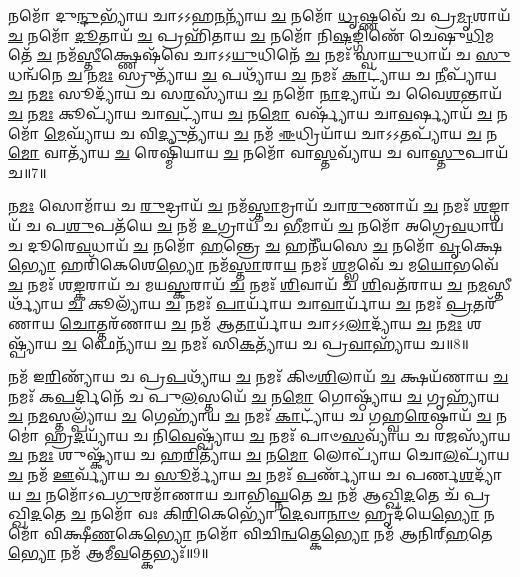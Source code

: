 𑌨𑌮𑍋᳴ 𑌦𑍁\-\ul{𑌨𑍍𑌦𑍁}\-𑌭𑍍𑌯𑌾᳴𑌯 𑌚𑌾𑌽𑌽𑌹\-\ul{𑌨}\-𑌨𑍍𑌯𑌾᳴𑌯 \ul{𑌚} 𑌨𑌮𑍋᳴ \ul{𑌧𑍃}\-𑌷𑍍𑌣𑌵𑍇᳴ 𑌚 𑌪𑍍𑌰\-\ul{𑌮𑍃}\-𑌶𑌾𑌯᳴ \ul{𑌚} 𑌨𑌮𑍋᳴ \ul{𑌦𑍂}\-𑌤𑌾𑌯᳴ \ul{𑌚} 𑌪𑍍𑌰𑌹𑌿᳴𑌤𑌾𑌯 \ul{𑌚} 𑌨𑌮𑍋᳴ 𑌨𑌿\-\ul{𑌷}\-𑌙𑍍𑌗𑌿𑌣𑍇᳴ 𑌚𑍇𑌷𑍁\-\ul{𑌧𑌿}\-𑌮𑌤𑍇᳴ \ul{𑌚} 𑌨𑌮᳴\-\ul{𑌸𑍍𑌤𑍀}\-𑌕𑍍𑌷𑍍𑌣𑍇𑌷᳴𑌵𑍇 𑌚𑌾𑌽𑌽\-\ul{𑌯𑍁}\-𑌧𑌿𑌨𑍇᳴ \ul{𑌚} 𑌨𑌮𑌃᳴ 𑌸𑍍𑌵𑌾\-\ul{𑌯𑍁}\-𑌧𑌾𑌯᳴ 𑌚 \ul{𑌸𑍁}\-𑌧𑌨𑍍𑌵᳴𑌨𑍇 \ul{𑌚} 𑌨\-\ul{𑌮𑌃} 𑌸𑍍𑌰𑍁𑌤𑍍𑌯𑌾᳴𑌯 \ul{𑌚} 𑌪𑌥𑍍𑌯𑌾᳴𑌯 \ul{𑌚} 𑌨𑌮𑌃᳴ \ul{𑌕𑌾}\-𑌟𑍍𑌯𑌾᳴𑌯 𑌚 \ul{𑌨𑍀}\-𑌪𑍍𑌯𑌾᳴𑌯 \ul{𑌚} 𑌨\-\ul{𑌮𑌃} 𑌸𑍂𑌦𑍍𑌯𑌾᳴𑌯 𑌚 𑌸\-\ul{𑌰}\-𑌸𑍍𑌯𑌾᳴𑌯 \ul{𑌚} 𑌨𑌮𑍋᳴ \ul{𑌨𑌾}\-𑌦𑍍𑌯𑌾𑌯᳴ 𑌚 𑌵𑍈\-\ul{𑌶}\-𑌨𑍍𑌤𑌾𑌯᳴ \ul{𑌚} 𑌨\-\ul{𑌮𑌃} 𑌕𑍂𑌪𑍍𑌯𑌾᳴𑌯 𑌚𑌾\-\ul{𑌵}\-𑌟𑍍𑌯𑌾᳴𑌯 \ul{𑌚} 𑌨\-\ul{𑌮𑍋} 𑌵𑌰𑍍𑌷𑍍𑌯𑌾᳴𑌯 𑌚𑌾\-\ul{𑌵}\-𑌰𑍍𑌷𑍍𑌯𑌾𑌯᳴ \ul{𑌚} 𑌨𑌮𑍋᳴ \ul{𑌮𑍇}\-𑌘𑍍𑌯𑌾᳴𑌯 𑌚 𑌵𑌿\-\ul{𑌦𑍍𑌯𑍁}\-𑌤𑍍𑌯𑌾᳴𑌯 \ul{𑌚} 𑌨𑌮᳴ \ul{𑌈}\-𑌧𑍍𑌰𑌿𑌯𑌾᳴𑌯 𑌚𑌾𑌽𑌽\-\ul{𑌤}\-𑌪𑍍𑌯𑌾᳴𑌯 \ul{𑌚} 𑌨\-\ul{𑌮𑍋} 𑌵𑌾𑌤𑍍𑌯𑌾᳴𑌯 \ul{𑌚} 𑌰𑍇𑌷𑍍𑌮𑌿᳴𑌯𑌾𑌯 \ul{𑌚} 𑌨𑌮𑍋᳴ 𑌵𑌾\-\ul{𑌸𑍍𑌤}\-𑌵𑍍𑌯𑌾᳴𑌯 𑌚 𑌵𑌾\-\ul{𑌸𑍍𑌤𑍁}\-𑌪𑌾𑌯᳴ 𑌚॥7॥ 

𑌨\-\ul{𑌮𑌃} 𑌸𑍋𑌮𑌾᳴𑌯 𑌚 \ul{𑌰𑍁}\-𑌦𑍍𑌰𑌾𑌯᳴ \ul{𑌚} 𑌨𑌮᳴\-\ul{𑌸𑍍𑌤𑌾}\-𑌮𑍍𑌰𑌾𑌯᳴ 𑌚𑌾\-\ul{𑌰𑍁}\-𑌣𑌾𑌯᳴ \ul{𑌚} 𑌨𑌮𑌃᳴ \ul{𑌶}\-𑌙𑍍𑌗𑌾𑌯᳴ 𑌚 𑌪\-\ul{𑌶𑍁}\-𑌪𑌤᳴𑌯𑍇 \ul{𑌚} 𑌨𑌮᳴ \ul{𑌉}\-𑌗𑍍𑌰𑌾𑌯᳴ 𑌚 \ul{𑌭𑍀}\-𑌮𑌾𑌯᳴ \ul{𑌚} 𑌨𑌮𑍋᳴ 𑌅𑌗𑍍𑌰𑍇\-\ul{𑌵}\-𑌧𑌾𑌯᳴ 𑌚 𑌦𑍂𑌰𑍇\-\ul{𑌵}\-𑌧𑌾𑌯᳴ \ul{𑌚} 𑌨𑌮𑍋᳴ \ul{𑌹}\-𑌨𑍍𑌤𑍍𑌰𑍇 \ul{𑌚} 𑌹𑌨𑍀᳴𑌯𑌸𑍇 \ul{𑌚} 𑌨𑌮𑍋᳴ \ul{𑌵𑍃}\-𑌕𑍍𑌷𑍇\-\ul{𑌭𑍍𑌯𑍋} 𑌹𑌰𑌿᳴𑌕𑍇𑌶𑍇\-\ul{𑌭𑍍𑌯𑍋} 𑌨𑌮᳴\-\ul{𑌸𑍍𑌤𑌾}\-𑌰𑌾\-\ul{𑌯} 𑌨𑌮𑌃᳴  \ul{𑌶}\-𑌮𑍍𑌭𑌵𑍇᳴ 𑌚 𑌮\-\ul{𑌯𑍋}\-𑌭𑌵𑍇᳴ \ul{𑌚} 𑌨𑌮𑌃᳴ 𑌶\-\ul{𑌙𑍍𑌕}\-𑌰𑌾𑌯᳴ 𑌚 𑌮𑌯\-\ul{𑌸𑍍𑌕}\-𑌰𑌾𑌯᳴ \ul{𑌚} 𑌨𑌮𑌃᳴ \ul{𑌶𑌿}\-𑌵𑌾𑌯᳴ 𑌚 \ul{𑌶𑌿}\-𑌵𑌤᳴𑌰𑌾𑌯 \ul{𑌚} 𑌨\-\ul{𑌮}\-𑌸𑍍𑌤𑍀𑌰𑍍𑌥𑍍𑌯𑌾᳴𑌯 \ul{𑌚} 𑌕𑍂𑌲𑍍𑌯𑌾᳴𑌯 \ul{𑌚} 𑌨𑌮𑌃᳴ \ul{𑌪𑌾}\-𑌰𑍍𑌯𑌾᳴𑌯 𑌚𑌾\-\ul{𑌵𑌾}\-𑌰𑍍𑌯𑌾᳴𑌯 \ul{𑌚} 𑌨𑌮𑌃᳴ \ul{𑌪𑍍𑌰}\-𑌤𑌰᳴𑌣𑌾𑌯 \ul{𑌚𑍋}\-𑌤𑍍𑌤𑌰᳴𑌣𑌾𑌯 \ul{𑌚} 𑌨𑌮᳴ 𑌆\-\ul{𑌤𑌾}\-𑌰𑍍𑌯𑌾᳴𑌯 𑌚𑌾𑌽𑌽\-\ul{𑌲𑌾}\-𑌦𑍍𑌯𑌾᳴𑌯 \ul{𑌚} 𑌨\-\ul{𑌮𑌃} 𑌶𑌷𑍍𑌪𑍍𑌯𑌾᳴𑌯 \ul{𑌚} 𑌫𑍇𑌨𑍍𑌯𑌾᳴𑌯 \ul{𑌚} 𑌨𑌮𑌃᳴ 𑌸𑌿\-\ul{𑌕}\-𑌤𑍍𑌯𑌾᳴𑌯 𑌚 𑌪𑍍𑌰\-\ul{𑌵𑌾}\-𑌹𑍍𑌯𑌾᳴𑌯 𑌚॥8॥ 

𑌨𑌮᳴ 𑌇\-\ul{𑌰𑌿}\-𑌣𑍍𑌯𑌾᳴𑌯 𑌚 𑌪𑍍𑌰\-\ul{𑌪}\-𑌥𑍍𑌯𑌾᳴𑌯 \ul{𑌚} 𑌨𑌮𑌃᳴ 𑌕𑌿𑍞\-\ul{𑌶𑌿}\-𑌲𑌾𑌯᳴ \ul{𑌚} 𑌕𑍍𑌷𑌯᳴𑌣𑌾𑌯 \ul{𑌚} 𑌨𑌮𑌃᳴ 𑌕\-\ul{𑌪}\-𑌰𑍍𑌦𑌿𑌨𑍇᳴ 𑌚 𑌪𑍁\-\ul{𑌲}\-𑌸𑍍𑌤𑌯𑍇᳴ \ul{𑌚} 𑌨\-\ul{𑌮𑍋} 𑌗𑍋𑌷𑍍𑌠𑍍𑌯𑌾᳴𑌯 \ul{𑌚} 𑌗𑍃𑌹𑍍𑌯𑌾᳴𑌯 \ul{𑌚} 𑌨\-\ul{𑌮}\-𑌸𑍍𑌤𑌲𑍍𑌪𑍍𑌯𑌾᳴𑌯 \ul{𑌚} 𑌗𑍇𑌹𑍍𑌯𑌾᳴𑌯 \ul{𑌚} 𑌨𑌮𑌃᳴ \ul{𑌕𑌾}\-𑌟𑍍𑌯𑌾᳴𑌯 𑌚 𑌗𑌹𑍍𑌵\-\ul{𑌰𑍇}\-𑌷𑍍𑌠𑌾𑌯᳴ \ul{𑌚} 𑌨𑌮𑍋॑ 𑌹𑍍𑌰\-\ul{𑌦}\-𑌯𑍍𑌯𑌾᳴𑌯 𑌚 𑌨𑌿\-\ul{𑌵𑍇}\-𑌷𑍍𑌪𑍍𑌯𑌾᳴𑌯 \ul{𑌚} 𑌨𑌮𑌃᳴ 𑌪𑌾𑍞\-\ul{𑌸}\-𑌵𑍍𑌯𑌾᳴𑌯 𑌚 𑌰\-\ul{𑌜}\-𑌸𑍍𑌯𑌾᳴𑌯 \ul{𑌚} 𑌨\-\ul{𑌮𑌃} 𑌶𑍁𑌷𑍍𑌕𑍍𑌯𑌾᳴𑌯 𑌚 𑌹\-\ul{𑌰𑌿}\-𑌤𑍍𑌯𑌾᳴𑌯 \ul{𑌚} 𑌨\-\ul{𑌮𑍋} 𑌲𑍋𑌪𑍍𑌯𑌾᳴𑌯 𑌚𑍋\-\ul{𑌲}\-𑌪𑍍𑌯𑌾᳴𑌯 \ul{𑌚} 𑌨𑌮᳴ \ul{𑌊}\-𑌰𑍍𑌵𑍍𑌯𑌾᳴𑌯 𑌚 \ul{𑌸𑍂}\-𑌰𑍍𑌮𑍍𑌯𑌾᳴𑌯 \ul{𑌚} 𑌨𑌮𑌃᳴ \ul{𑌪}\-𑌰𑍍𑌣𑍍𑌯𑌾᳴𑌯 𑌚 𑌪𑌰𑍍𑌣\-\ul{𑌶}\-𑌦𑍍𑌯𑌾᳴𑌯 \ul{𑌚} 𑌨𑌮𑍋᳴𑌽𑌪\-\ul{𑌗𑍁}\-𑌰𑌮𑌾᳴𑌣𑌾𑌯 𑌚𑌾𑌭𑌿\-\ul{𑌘𑍍𑌨}\-𑌤𑍇 \ul{𑌚} 𑌨𑌮᳴ 𑌆𑌖𑍍𑌖𑌿\-\ul{𑌦}\-𑌤𑍇 𑌚᳴ 𑌪𑍍𑌰𑌖𑍍𑌖𑌿\-\ul{𑌦}\-𑌤𑍇 \ul{𑌚} 𑌨𑌮𑍋᳴ 𑌵𑌃 𑌕𑌿\-\ul{𑌰𑌿}\-𑌕𑍇𑌭𑍍𑌯𑍋᳴ \ul{𑌦𑍇}\-𑌵𑌾\-\ul{𑌨𑌾}\-\-\ul{𑍞} 𑌹𑍃𑌦᳴𑌯𑍇\-\ul{𑌭𑍍𑌯𑍋} 𑌨𑌮𑍋᳴ 𑌵𑌿𑌕𑍍𑌷𑍀\-\ul{𑌣}\-𑌕𑍇\-\ul{𑌭𑍍𑌯𑍋} 𑌨𑌮𑍋᳴ 𑌵𑌿𑌚𑌿\-\ul{𑌨𑍍𑌵}\-𑌤𑍍𑌕𑍇\-\ul{𑌭𑍍𑌯𑍋} 𑌨𑌮᳴ 𑌆𑌨𑌿𑌰𑍍‌\-\ul{𑌹}\-𑌤𑍇\-\ul{𑌭𑍍𑌯𑍋} 𑌨𑌮᳴ 𑌆𑌮𑍀\-\ul{𑌵}\-𑌤𑍍𑌕𑍇𑌭𑍍𑌯𑌃᳴॥9॥ 

